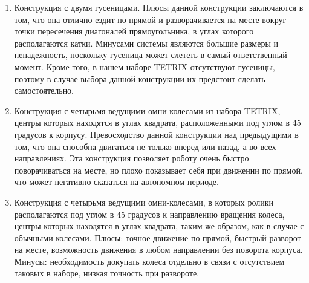 \begin{enumerate}
\begin{enumerate}
\begin{enumerate}
\begin{enumerate}
	      \item Конструкция с двумя гусеницами. Плюсы данной конструкции заключаются в том, что она отлично ездит по прямой  и разворачивается на месте вокруг точки пересечения диагоналей прямоугольника, в углах которого располагаются катки. Минусами системы являются большие размеры и ненадежность, поскольку гусеница может слететь в самый ответственный момент. Кроме того, в нашем наборе TETRIX отсутствуют гусеницы, поэтому в случае выбора данной конструкции их предстоит сделать самостоятельно.
	      
	      \item Конструкция с четырьмя ведущими омни-колесами из набора TETRIX, центры которых находятся в углах квадрата, расположенными под углом в 45 градусов к корпусу. Превосходство данной конструкции над предыдущими в том, что она способна двигаться не только вперед или назад, а во всех направлениях. Эта конструкция позволяет роботу очень быстро поворачиваться на месте, но плохо показывает себя при движении по прямой, что может негативно сказаться на автономном периоде.
	      
	      \item Конструкция с четырьмя ведущими омни-колесами, в которых ролики располагаются под углом в 45 градусов к направлению вращения колеса, центры которых находятся в углах квадрата, таким же образом, как в случае с обычными колесами. Плюсы: точное движение по прямой, быстрый разворот на месте, возможность движения в любом направлении без поворота корпуса. Минусы: необходимость докупать колеса отдельно в связи с отсутствием таковых в наборе, низкая точность при развороте.
	      

\end{enumerate}
\end{enumerate}
\end{enumerate}
\end{enumerate}
